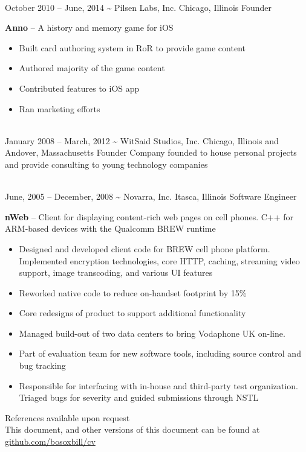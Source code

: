 \documentclass[]{friggeri-cv}
\begin{document}
\begin{entrylist}
    \\[1cm]%
    \entryalt
    {October 2010 -- June, 2014}
    {\textbf{\textasciitilde} Pilsen Labs, Inc.}
    {Chicago, Illinois}
    {Founder}
    {\textbf{Anno} -- A history and memory game for iOS
    \begin{itemize}
      \item Built card authoring system in RoR to provide game content
      \item Authored majority of the game content
      \item Contributed features to iOS app
      \item Ran marketing efforts
    \end{itemize}}

    \\[1cm]%
    \entryalt
    {January 2008 -- March, 2012}
    {\textbf{\textasciitilde} WitSaid Studios, Inc.}
    {Chicago, Illinois and Andover, Massachusetts}
    {Founder}
    {Company founded to house personal projects and provide consulting to young technology companies}

    \\[1cm]%
    \entryalt
    {June, 2005 -- December, 2008}
    {\textbf{\textasciitilde} Novarra, Inc.}
    {Itasca, Illinois}
    {Software Engineer}
    {\textbf{nWeb} -- Client for displaying content-rich web pages on cell phones. C++ for ARM-based devices with the Qualcomm BREW runtime
    \begin{itemize}
      \item Designed and developed client code for BREW cell phone platform. Implemented encryption technologies, core HTTP, caching, streaming video support, image transcoding, and various UI features
      \item Reworked native code to reduce on-handset footprint by 15\%
      \item Core redesigns of product to support additional functionality
      \item Managed build-out of two data centers to bring Vodaphone UK on-line.
      \item Part of evaluation team for new software tools, including source control and bug tracking
      \item Responsible for interfacing with in-house and third-party test organization. Triaged bugs for severity and guided submissions through NSTL
     \end{itemize}}
\end{entrylist} 

\vspace*{\fill}
References available upon request\\
This document, and other versions of this document can be found at \href{http://github.com/bosoxbill/cv/}{github.com/bosoxbill/cv}
\end{document}
